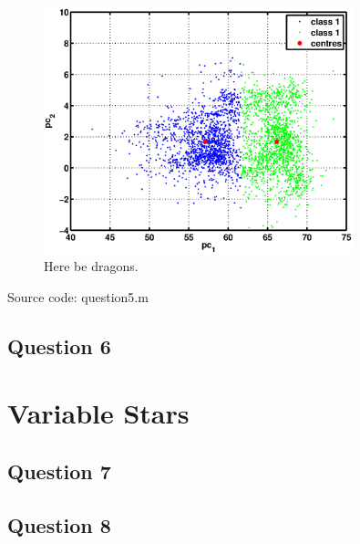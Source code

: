 \documentclass[a4paper, 11pt]{article}
\begin{document}
\begin{figure}[H]
    \centering
    \includegraphics[width=0.8\textwidth]{figures/question5_1}
    \caption{Here be dragons.}\label{fig:question5_1}
\end{figure}

Source code: question5.m

\subsection*{Question 6}


\section{Variable Stars} %
\label{sec:variable_stars}

\subsection*{Question 7}

\subsection*{Question 8}

\end{document}
